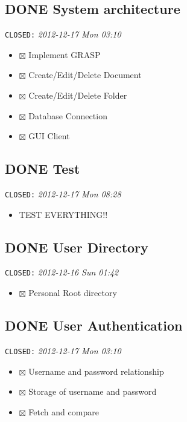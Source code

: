 \documentclass[11pt,a4paper]{article}
\begin{document}
\subsection{\textbf{DONE} System architecture}
\label{sec-2-5}

   \texttt{CLOSED:} \textit{2012-12-17 Mon 03:10}

\begin{itemize}
\item $\boxtimes$ Implement GRASP
\item $\boxtimes$ Create/Edit/Delete Document
\item $\boxtimes$ Create/Edit/Delete Folder
\item $\boxtimes$ Database Connection
\item $\boxtimes$ GUI Client
\end{itemize}
\subsection{\textbf{DONE} Test}
\label{sec-2-6}

   \texttt{CLOSED:} \textit{2012-12-17 Mon 08:28}

\begin{itemize}
\item TEST EVERYTHING!!
\end{itemize}
\subsection{\textbf{DONE} User Directory}
\label{sec-2-7}

   \texttt{CLOSED:} \textit{2012-12-16 Sun 01:42}

\begin{itemize}
\item $\boxtimes$ Personal Root directory
\end{itemize}
\subsection{\textbf{DONE} User Authentication}
\label{sec-2-8}

   \texttt{CLOSED:} \textit{2012-12-17 Mon 03:10}

\begin{itemize}
\item $\boxtimes$ Username and password relationship
\item $\boxtimes$ Storage of username and password
\item $\boxtimes$ Fetch and compare
\end{itemize}
\end{document}
